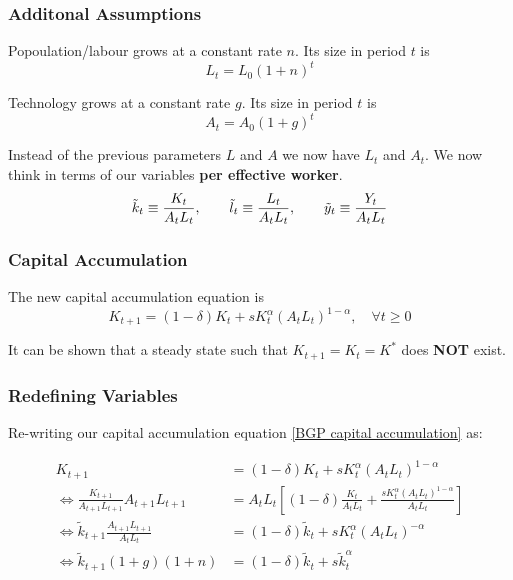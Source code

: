 \documentclass[11pt]{article}
\begin{document}
\subsubsection{Additonal Assumptions}

\begin{shaded}
    Popoulation/labour grows at a constant rate $n$. Its size in period $t$ is
    \[L_t = L_0(1+n)^t\]

    Technology grows at a constant rate $g$. Its size in period $t$ is
    \[A_t = A_0(1+g)^t\]

    Instead of the previous parameters $L$ and $A$ we now have $L_t$ and $A_t$. We now think in terms of our variables \textbf{per effective worker}.
    \[\Tilde{k}_t \equiv\dfrac{K_t}{A_tL_t}, \qquad \Tilde{l}_t \equiv\dfrac{L_t}{A_tL_t}, \qquad \Tilde{y}_t \equiv\dfrac{Y_t}{A_tL_t}\]
\end{shaded}

\subsubsection{Capital Accumulation}

The new capital accumulation equation is
\begin{equation}
    \label{BGP capital accumulation}
    K_{t+1} = (1-\delta)K_t + sK_t^\alpha (A_tL_t)^{1-\alpha}, \quad \forall t \geq0
\end{equation}

It can be shown that a steady state such that $K_{t+1} = K_t = K^*$ does \textbf{NOT} exist.

\subsubsection{Redefining Variables}

Re-writing our capital accumulation equation \eqref{BGP capital accumulation} as:

\begin{equation}
\begin{aligned}
K_{t+1} & =(1-\delta) K_t+s K_t^\alpha\left(A_t L_t\right)^{1-\alpha} \\
\Leftrightarrow \frac{K_{t+1}}{A_{t+1} L_{t+1}} A_{t+1} L_{t+1} & =A_t L_t\left[(1-\delta) \frac{K_t}{A_t L_t}+\frac{s K_t^\alpha\left(A_t L_t\right)^{1-\alpha}}{A_t L_t}\right] \\
\Leftrightarrow \tilde{k}_{t+1} \frac{A_{t+1} L_{t+1}}{A_t L_t} & =(1-\delta) \tilde{k}_t+s K_t^\alpha\left(A_t L_t\right)^{-\alpha} \\
\Leftrightarrow \tilde{k}_{t+1}(1+g)(1+n) & =(1-\delta) \tilde{k}_t+s \tilde{k}_t^\alpha
\end{aligned}
\end{equation}
\end{document}
